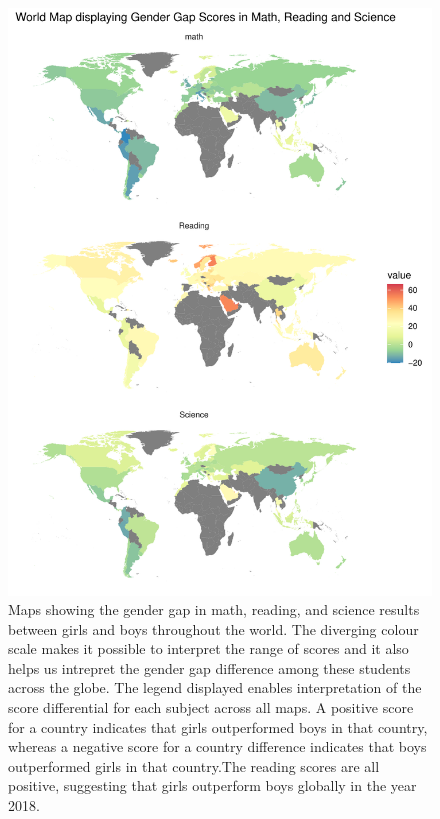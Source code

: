 \begin{Schunk}
\begin{figure}[H]
\includegraphics[width=1\linewidth]{learningtower_files/figure-latex/ggplot-maps-1} \caption[Maps showing the gender gap in math, reading, and science results between girls and boys throughout the world]{Maps showing the gender gap in math, reading, and science results between girls and boys throughout the world. The diverging colour scale makes it possible to interpret the range of scores and it also helps us intrepret the gender gap difference among these students across the globe. The legend displayed enables interpretation of the score differential for each subject across all maps. A positive score for a country indicates that girls outperformed boys in that country, whereas a negative score for a country difference indicates that boys outperformed girls in that country.The reading scores are all positive, suggesting that girls outperform boys globally in the year 2018.}\label{fig:ggplot-maps}
\end{figure}
\end{Schunk}

